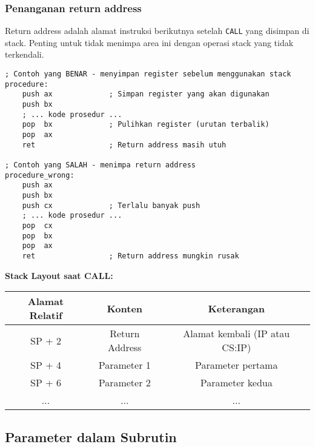 \documentclass[../main.tex]{subfiles}
\begin{document}
            \subsubsection{Penanganan return address}
                Return address adalah alamat instruksi berikutnya setelah \texttt{CALL} yang disimpan di stack. Penting untuk tidak menimpa area ini dengan operasi stack yang tidak terkendali.

                \begin{lstlisting}[language={[x86masm]Assembler}, caption=Penanganan Return Address, label={lst:return-address}]
; Contoh yang BENAR - menyimpan register sebelum menggunakan stack
procedure:
    push ax             ; Simpan register yang akan digunakan
    push bx
    ; ... kode prosedur ...
    pop  bx             ; Pulihkan register (urutan terbalik)
    pop  ax
    ret                 ; Return address masih utuh

; Contoh yang SALAH - menimpa return address
procedure_wrong:
    push ax
    push bx
    push cx             ; Terlalu banyak push
    ; ... kode prosedur ...
    pop  cx
    pop  bx
    pop  ax
    ret                 ; Return address mungkin rusak
                \end{lstlisting}

                \textbf{Stack Layout saat CALL:}
                \begin{center}
                    \begin{tabular}{|c|c|c|}
                        \hline
                        \textbf{Alamat Relatif} & \textbf{Konten} & \textbf{Keterangan} \\
                        \hline
                        SP + 2 & Return Address & Alamat kembali (IP atau CS:IP) \\
                        \hline
                        SP + 4 & Parameter 1 & Parameter pertama \\
                        \hline
                        SP + 6 & Parameter 2 & Parameter kedua \\
                        \hline
                        ... & ... & ... \\
                        \hline
                    \end{tabular}
                \end{center}

        \subsection{Parameter dalam Subrutin}
\end{document}
